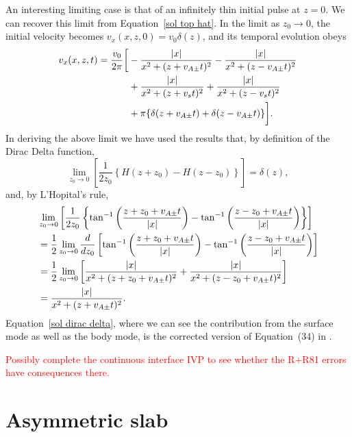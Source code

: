 \documentclass[12pt]{../style-files/ociamthesis}
\begin{document}
An interesting limiting case is that of an infinitely thin initial pulse at $z = 0$. We can recover this limit from Equation~\eqref{sol top hat}. In the limit as $z_0 \to 0$, the initial velocity becomes $v_x(x, z, 0) = v_0 \delta(z)$, and its temporal evolution obeys
\begin{align}
v_x(x, z, t) = \frac{v_0}{2\pi} \bigg[ &- \frac{|x|}{x^2 + (z + v_{A\pm}t)^2} - \frac{|x|}{x^2 + (z - v_{A\pm}t)^2} \notag \\
&+ \frac{|x|}{x^2 + (z + v_st)^2} + \frac{|x|}{x^2 + (z - v_st)^2} \notag \\
&+ \pi\{\delta(z + v_{A\pm}t) + \delta(z - v_{A\pm}t)\} \bigg]. \label{sol dirac delta}
\end{align}
In deriving the above limit we have used the results that, by definition of the Dirac Delta function,
\begin{equation}
\lim_{z_0 \to 0} \left[\frac{1}{2z_0} \left\{H(z + z_0) - H(z - z_0)\right\}\right] = \delta(z),
\end{equation}
and, by L'Hopital's rule,
\begin{align}
&\lim_{z_0 \to 0} \left[\frac{1}{2z_0}\left\{\tan^{-1}\left( \frac{z + z_0 + v_{A\pm}t}{|x|} \right) - \tan^{-1}\left( \frac{z - z_0 + v_{A\pm}t}{|x|} \right)\right\}\right] \notag \\
&= \frac{1}{2} \lim_{z_0 \to 0} \frac{d}{dz_0} \left[\tan^{-1}\left( \frac{z + z_0 + v_{A\pm}t}{|x|} \right) - \tan^{-1}\left( \frac{z - z_0 + v_{A\pm}t}{|x|} \right)\right] \notag \\
&= \frac{1}{2} \lim_{z_0 \to 0} \left[ \frac{|x|}{x^2 + (z + z_0 + v_{A\pm}t)^2} + \frac{|x|}{x^2 + (z - z_0 + v_{A\pm}t)^2} \right] \notag \\
&= \frac{|x|}{x^2 + (z + v_{A\pm}t)^2}.
\end{align}
Equation~\eqref{sol dirac delta}, where we can see the contribution from the surface mode as well as the body mode, is the corrected version of Equation~(34) in \cite{rae_etal81}.

\textcolor{red}{Possibly complete the continuous interface IVP to see whether the R+R81 errors have consequences there.}

\section{Asymmetric slab}
\label{sec: IVP slab}
\end{document}
